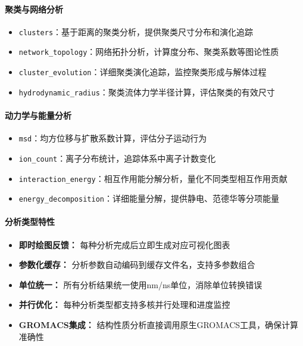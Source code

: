 \paragraph{聚类与网络分析}

\begin{itemize}
    \item \lstinline|clusters|：基于距离的聚类分析，提供聚类尺寸分布和演化追踪
    \item \lstinline|network_topology|：网络拓扑分析，计算度分布、聚类系数等图论性质
    \item \lstinline|cluster_evolution|：详细聚类演化追踪，监控聚类形成与解体过程
    \item \lstinline|hydrodynamic_radius|：聚类流体力学半径计算，评估聚类的有效尺寸
\end{itemize}

\paragraph{动力学与能量分析}

\begin{itemize}
    \item \lstinline|msd|：均方位移与扩散系数计算，评估分子运动行为
    \item \lstinline|ion_count|：离子分布统计，追踪体系中离子计数变化
    \item \lstinline|interaction_energy|：相互作用能分解分析，量化不同类型相互作用贡献
    \item \lstinline|energy_decomposition|：详细能量分解，提供静电、范德华等分项能量
\end{itemize}

\paragraph{分析类型特性}

\begin{itemize}
    \item \textbf{即时绘图反馈：} 每种分析完成后立即生成对应可视化图表
    \item \textbf{参数化缓存：} 分析参数自动编码到缓存文件名，支持多参数组合
    \item \textbf{单位统一：} 所有分析结果统一使用nm/ns单位，消除单位转换错误
    \item \textbf{并行优化：} 每种分析类型都支持多核并行处理和进度监控
    \item \textbf{GROMACS集成：} 结构性质分析直接调用原生GROMACS工具，确保计算准确性
\end{itemize}